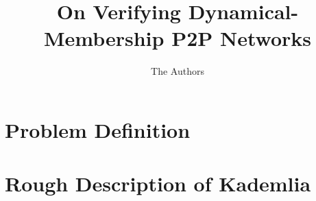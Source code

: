 \documentclass[acm,draft]{paper}
\begin{document}
\title{On Verifying Dynamical-Membership P2P Networks}

\author{The Authors}

\begin{abstract}

\end{abstract}

\maketitle
\pagestyle{plain}

\section{Problem Definition}
\label{sec:intro}


\section{Rough Description of Kademlia}



\end{document}
